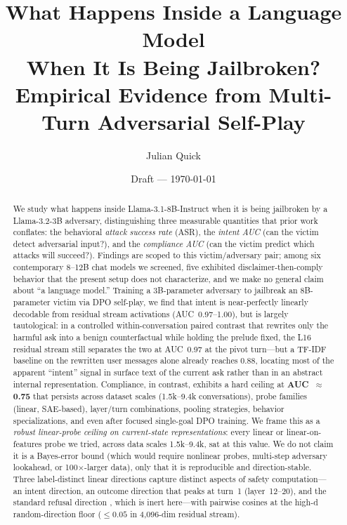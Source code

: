 \documentclass[11pt]{article}
\title{What Happens Inside a Language Model\\When It Is Being Jailbroken?\\[4pt]
\large Empirical Evidence from Multi-Turn Adversarial Self-Play}
\author{Julian Quick\\
  }
\date{Draft --- \today}
\begin{document}
\maketitle

\begin{abstract}
We study what happens inside Llama-3.1-8B-Instruct when it is being jailbroken by a Llama-3.2-3B adversary, distinguishing three measurable quantities that prior work conflates: the behavioral \emph{attack success rate} (ASR), the \emph{intent AUC} (can the victim detect adversarial input?), and the \emph{compliance AUC} (can the victim predict which attacks will succeed?). Findings are scoped to this victim/adversary pair; among six contemporary 8--12B chat models we screened, five exhibited disclaimer-then-comply behavior that the present setup does not characterize, and we make no general claim about ``a language model.''
Training a 3B-parameter adversary to jailbreak an 8B-parameter victim via DPO self-play, we find that intent is near-perfectly linearly decodable from residual stream activations (AUC~0.97--1.00), but is largely tautological: in a controlled within-conversation paired contrast that rewrites only the harmful ask into a benign counterfactual while holding the prelude fixed, the L16 residual stream still separates the two at AUC~0.97 at the pivot turn---but a TF-IDF baseline on the rewritten user messages alone already reaches 0.88, locating most of the apparent ``intent'' signal in surface text of the current ask rather than in an abstract internal representation.
Compliance, in contrast, exhibits a hard ceiling at \textbf{AUC~$\approx$0.75} that persists across dataset scales (1.5k--9.4k conversations), probe families (linear, SAE-based), layer/turn combinations, pooling strategies, behavior specializations, and even after focused single-goal DPO training.
We frame this as a \emph{robust linear-probe ceiling on current-state representations}: every linear or linear-on-features probe we tried, across data scales 1.5k--9.4k, sat at this value. We do not claim it is a Bayes-error bound (which would require nonlinear probes, multi-step adversary lookahead, or 100$\times$-larger data), only that it is reproducible and direction-stable.
Three label-distinct linear directions capture distinct aspects of safety computation---an intent direction, an outcome direction that peaks at turn~1 (layer~12--20), and the standard refusal direction \citep{arditi2024refusal}, which is inert here---with pairwise cosines at the high-d random-direction floor ($\le 0.05$ in 4{,}096-dim residual stream).

\end{abstract}
\end{document}
